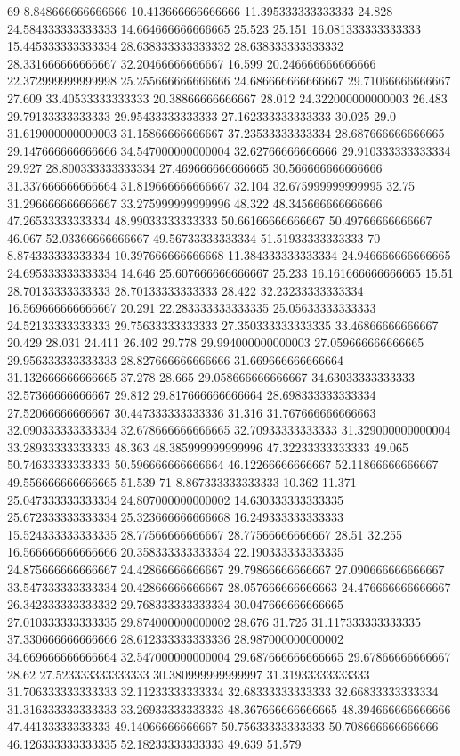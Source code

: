 69 8.848666666666666 10.413666666666666 11.395333333333333 24.828 24.584333333333333 14.664666666666665 25.523 25.151 16.081333333333333 15.445333333333334 28.638333333333332 28.638333333333332 28.331666666666667 32.20466666666667 16.599 20.246666666666666 22.372999999999998 25.255666666666666 24.686666666666667 29.71066666666667 27.609 33.40533333333333 20.38866666666667 28.012 24.322000000000003 26.483 29.79133333333333 29.95433333333333 27.162333333333333 30.025 29.0 31.619000000000003 31.15866666666667 37.23533333333334 28.687666666666665 29.147666666666666 34.547000000000004 32.62766666666666 29.910333333333334 29.927 28.800333333333334 27.469666666666665 30.566666666666666 31.337666666666664 31.819666666666667 32.104 32.675999999999995 32.75 31.296666666666667 33.275999999999996 48.322 48.345666666666666 47.26533333333334 48.99033333333333 50.66166666666667 50.49766666666667 46.067 52.03366666666667 49.56733333333334 51.51933333333333
70 8.874333333333334 10.397666666666668 11.384333333333334 24.946666666666665 24.695333333333334 14.646 25.607666666666667 25.233 16.161666666666665 15.51 28.70133333333333 28.70133333333333 28.422 32.23233333333334 16.569666666666667 20.291 22.283333333333335 25.05633333333333 24.52133333333333 29.75633333333333 27.350333333333335 33.46866666666667 20.429 28.031 24.411 26.402 29.778 29.994000000000003 27.059666666666665 29.956333333333333 28.827666666666666 31.669666666666664 31.132666666666665 37.278 28.665 29.058666666666667 34.63033333333333 32.57366666666667 29.812 29.817666666666664 28.698333333333334 27.52066666666667 30.447333333333336 31.316 31.767666666666663 32.090333333333334 32.678666666666665 32.70933333333333 31.329000000000004 33.28933333333333 48.363 48.385999999999996 47.32233333333333 49.065 50.74633333333333 50.596666666666664 46.12266666666667 52.11866666666667 49.556666666666665 51.539
71 8.867333333333333 10.362 11.371 25.047333333333334 24.807000000000002 14.630333333333335 25.672333333333334 25.323666666666668 16.249333333333333 15.524333333333335 28.77566666666667 28.77566666666667 28.51 32.255 16.566666666666666 20.358333333333334 22.190333333333335 24.875666666666667 24.42866666666667 29.79866666666667 27.090666666666667 33.547333333333334 20.42866666666667 28.057666666666663 24.476666666666667 26.342333333333332 29.768333333333334 30.047666666666665 27.010333333333335 29.874000000000002 28.676 31.725 31.117333333333335 37.330666666666666 28.612333333333336 28.987000000000002 34.669666666666664 32.547000000000004 29.687666666666665 29.67866666666667 28.62 27.523333333333333 30.380999999999997 31.31933333333333 31.706333333333333 32.11233333333334 32.68333333333333 32.66833333333334 31.316333333333333 33.26933333333333 48.367666666666665 48.394666666666666 47.44133333333333 49.14066666666667 50.75633333333333 50.708666666666666 46.126333333333335 52.18233333333333 49.639 51.579

